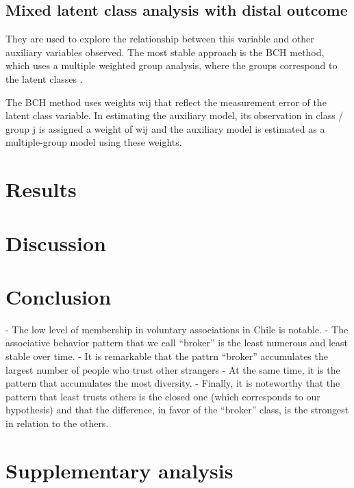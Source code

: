 \subsection{Mixed latent class analysis with distal outcome}

They are used to explore the relationship between this variable and other auxiliary variables observed. The most stable approach is the BCH method, which uses a multiple weighted group analysis, where the groups correspond to the latent classes \parencite{bakk_relating_2014}.
\bigskip

The BCH method uses weights wij that reflect the measurement error of the latent class variable. In estimating the auxiliary model, its observation in class / group j is assigned a weight of wij and the auxiliary model is estimated as a multiple-group model using these weights. 

\section{Results}

\section{Discussion}

\section{Conclusion}

- The low level of membership in voluntary associations in Chile is notable.
- The associative behavior pattern that we call “broker” is the least numerous and least stable over time.
- It is remarkable that the pattrn “broker” accumulates the largest number of people who trust other strangers
- At the same time, it is the pattern that accumulates the most diversity.
- Finally, it is noteworthy that the pattern that least trusts others is the
closed one (which corresponds to our hypothesis) and that the difference, in favor of the “broker” class, is the strongest in relation to the others.

\newpage

\printbibliography

\newpage

\section{Supplementary analysis}

